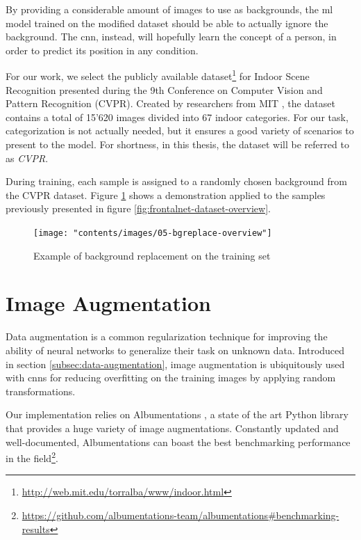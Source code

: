 By providing a considerable amount of images to use as backgrounds, the \gls{ml} model trained on the modified dataset should be able to actually ignore the background. The \gls{cnn}, instead, will hopefully learn the concept of a person, in order to predict its position in any condition.

\medskip

For our work, we select the publicly available dataset\footnote{\url{http://web.mit.edu/torralba/www/indoor.html}} for Indoor Scene Recognition presented during the 9th Conference on Computer Vision and Pattern Recognition (CVPR). Created by researchers from MIT \cite{cvpr09}, the dataset contains a total of 15'620 images divided into 67 indoor categories. For our task, categorization is not actually needed, but it ensures a good variety of scenarios to present to the model. For shortness, in this thesis, the dataset will be referred to as \textit{CVPR}.

During training, each sample is assigned to a randomly chosen background from the CVPR dataset. Figure \ref{fig:bgreplace-example} shows a demonstration applied to the samples previously presented in figure \ref{fig:frontalnet-dataset-overview}. 

\vspace*{5ex}
\begin{figure}[!h]
	\centering
	\texttt{[image: "contents/images/05-bgreplace-overview"]}
	\caption[Example of background replacement on the training set]{Example of background replacement on the training set}
	\label{fig:bgreplace-example}
\end{figure}
\clearpage




\section{Image Augmentation}
\label{sec:implementation-imgaug}

Data augmentation is a common regularization technique for improving the ability of neural networks to generalize their task on unknown data. Introduced in section \ref{subsec:data-augmentation}, image augmentation is ubiquitously used with \gls{cnn}s for reducing overfitting on the training images by applying random transformations.

Our implementation relies on Albumentations \cite{Buslaev_2020}, a state of the art Python library that provides a huge variety of image augmentations. Constantly updated and well-documented, Albumentations can boast the best benchmarking performance in the field\footnote{\url{https://github.com/albumentations-team/albumentations\#benchmarking-results}}.

